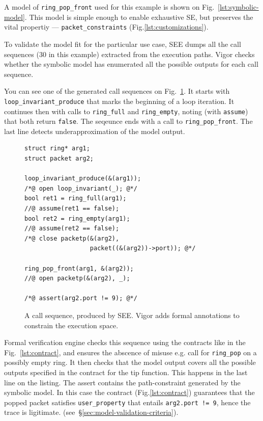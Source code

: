 \documentclass[letterpaper,twocolumn,10pt]{article}
\newcommand{\code}[1]{\lstinline{#1}}
\begin{document}
A model of \code{ring_pop_front} used for this example is shown on
Fig.~\ref{lst:symbolic-model}. This model is simple enough to enable
exhaustive SE, but preserves the vital propertiy --- \code{packet_constraints}
(Fig.\ref{lst:customizations}).

To validate the model fit for the particular use case, SEE dumps all the call
sequences (30 in this example) extracted from the execution paths. Vigor
checks whether the symbolic model has enumerated all the possible outputs for
each call sequence.

You can see one of the generated call sequences on Fig.~\ref{lst:call-sequence}.
It starts with \code{loop_invariant_produce} that marks the beginning of a loop
iteration. It continues then with calls to \code{ring_full} and \code{ring_empty},
noting (with \code{assume}) that both return \code{false}. The seqeunce ends
with a call to \code{ring_pop_front}. The last line detects underapproximation
of the model output.
 
\begin{figure}[h]
\begin{lstlisting}
struct ring* arg1;
struct packet arg2;

loop_invariant_produce(&(arg1));
/*@ open loop_invariant(_); @*/
bool ret1 = ring_full(arg1);
//@ assume(ret1 == false);
bool ret2 = ring_empty(arg1);
//@ assume(ret2 == false);
/*@ close packetp(&(arg2),
                  packet((&(arg2))->port)); @*/

ring_pop_front(arg1, &(arg2));
//@ open packetp(&(arg2), _);

/*@ assert(arg2.port != 9); @*/
\end{lstlisting}
  \caption{A call sequence, produced by SEE. Vigor adds formal annotations to
    constrain the execution space.}
  \label{lst:call-sequence}
\end{figure}

Formal verification engine checks this sequence using the contracts like in the
Fig.~\ref{lst:contract}, and ensures the abscence of misuse e.g. call for
\code{ring_pop} on a possibly empty ring. It then checks that the model output
covers all the possible outputs specified in the contract for the tip function.
This happens in the last line on the listing. The assert contains the
path-constraint generated by the symbolic model. In this case the contract
(Fig.\ref{lst:contract}) guarantees that the popped packet satisfies
\code{user_property} that entails \code{arg2.port != 9}, hence the trace is
ligitimate. (see~\S\ref{sec:model-validation-criteria}).
\end{document}

